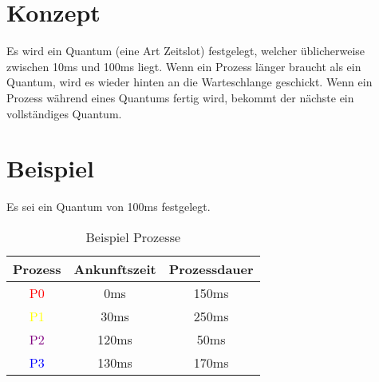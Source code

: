 \documentclass{article}
\begin{document}
\newcommand{\PZero}{\textcolor{red}{P0}}
\newcommand{\POne}{\textcolor{yellow}{P1}}
\newcommand{\PTwo}{\textcolor{purple}{P2}}
\newcommand{\PThree}{\textcolor{blue}{P3}}

\maketitle

\section{Konzept}

Es wird ein Quantum (eine Art Zeitslot) festgelegt, welcher üblicherweise zwischen 10ms und 100ms liegt. Wenn ein Prozess länger braucht als ein Quantum, wird es wieder hinten an die Warteschlange geschickt. Wenn ein Prozess während eines Quantums fertig wird, bekommt der nächste ein vollständiges Quantum.

\section{Beispiel}

Es sei ein Quantum von 100ms festgelegt.

\begin{table}[!h]
    \centering
    \begin{tabular}{c|c|c}
        \textbf{Prozess} & \textbf{Ankunftszeit} & \textbf{Prozessdauer} \\
        \hline{}
        \PZero{}         & 0ms                   & 150ms                 \\
        \POne{}          & 30ms                  & 250ms                 \\
        \PTwo{}          & 120ms                 & 50ms                  \\
        \PThree{}        & 130ms                 & 170ms
    \end{tabular}
    \caption{Beispiel Prozesse}
\end{table}
\end{document}
